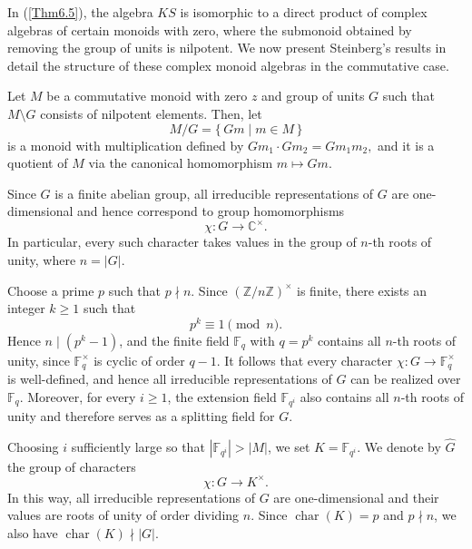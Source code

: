 \documentclass[11pt,reqno]{amsart}
\theoremstyle{plain}
\theoremstyle{remark}
\theoremstyle{definition}
\begin{document}

In (\ref{Thm6.5}), the algebra $KS$ is isomorphic to a direct product of complex algebras of certain monoids with zero, where the submonoid obtained by removing the group of units is nilpotent. We now present Steinberg’s results in detail the structure of these complex monoid algebras in the commutative case.

Let $M$ be a commutative monoid with zero $z$ and group of units $G$ such that $M\setminus G$ consists of nilpotent elements.
Then, let
\[
M/G = \{\, Gm \mid m \in M \,\}
\]
is a monoid with multiplication defined by
\(
Gm_1 \cdot Gm_2 = Gm_1 m_2,
\)
and it is a quotient of $M$ via the canonical homomorphism
\(
m \mapsto Gm.
\)

Since $G$ is a finite abelian group, all irreducible representations of $G$ are one-dimensional and hence correspond to group homomorphisms
\[
\chi : G \to \mathbb{C}^\times.
\]
In particular, every such character takes values in the group of $n$-th roots of unity, where $n = |G|$.

Choose a prime $p$ such that $p \nmid n$. Since $(\mathbb{Z}/n\mathbb{Z})^\times$ is finite, there exists an integer $k \ge 1$ such that
\[
p^k \equiv 1 \pmod n.
\]
Hence $n \mid (p^k - 1)$, and the finite field $\mathbb{F}_q$ with $q=p^k$ contains all $n$-th roots of unity, since $\mathbb{F}_q^\times$ is cyclic of order $q-1$.
It follows that every character $\chi : G \to \mathbb{F}_q^\times$ is well-defined, and hence all irreducible representations of $G$ can be realized over $\mathbb{F}_q$. Moreover, for every $i \ge 1$, the extension field $\mathbb{F}_{q^i}$ also contains all $n$-th roots of unity and therefore serves as a splitting field for $G$.

Choosing $i$ sufficiently large so that $|\mathbb{F}_{q^i}| > |M|$, we set $K=\mathbb{F}_{q^i}$. We denote by $\widehat{G}$ the group of characters
\[
\chi : G \to K^\times.
\]
In this way, all irreducible representations of $G$ are one-dimensional and their values are roots of unity of order dividing $n$. Since $\operatorname{char}(K)=p$ and $p \nmid n$, we also have $\operatorname{char}(K)\nmid |G|.$
\end{document}
